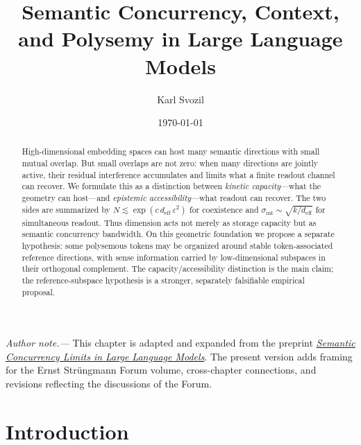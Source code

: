 \documentclass[
  aps,
  reprint,
  superscriptaddress,
  floatfix,
  nofootinbib,
  longbibliography
]{revtex4-2}
\newcommand{\deff}{d_{\mathrm{eff}}}
\newcommand{\sint}{\sigma_{\mathrm{int}}}
\begin{document}
\title{Semantic Concurrency, Context, and Polysemy in Large Language Models}

\author{Karl Svozil}

\date{\today}

\begin{abstract}
High-dimensional embedding spaces can host many semantic directions
with small mutual overlap. But small overlaps are not zero: when many
directions are jointly active, their residual interference accumulates
and limits what a finite readout channel can recover. We formulate this
as a distinction between \emph{kinetic capacity}---what the geometry
can host---and \emph{epistemic accessibility}---what readout can
recover. The two sides are summarized by
$N\lesssim\exp(c\,\deff\,\varepsilon^{2})$ for coexistence and
$\sint\sim\sqrt{k/\deff}$ for simultaneous readout. Thus dimension acts
not merely as storage capacity but as semantic concurrency bandwidth.
On this geometric foundation we propose a separate hypothesis: some
polysemous tokens may be organized around stable token-associated
reference directions, with sense information carried by low-dimensional
subspaces in their orthogonal complement. The capacity/accessibility
distinction is the main claim; the reference-subspace hypothesis is a stronger,
separately falsifiable empirical proposal.
\end{abstract}

\maketitle

\noindent\textit{Author note.---}
This chapter is adapted and expanded from the preprint
\href{https://doi.org/10.48550/arXiv.2504.13824}{\textit{Semantic
Concurrency Limits in Large Language Models}}.  The present version adds
framing for the Ernst Str\"ungmann Forum volume, cross-chapter connections,
and revisions reflecting the discussions of the Forum.

\section{Introduction}
\label{sec:intro}
\end{document}
